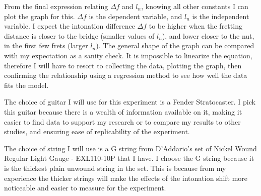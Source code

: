 From the final expression relating $\Delta f$ and $l_n$, knowing all other constants I can plot the graph for this. $\Delta f$ is the dependent variable, and $l_n$ is the independent variable. I expect the intonation difference $\Delta f$ to be higher when the fretting distance is closer to the bridge (smaller values of $l_n$), and lower closer to the nut, in the first few frets (larger $l_n$). The general shape of the graph can be compared with my expectation as a sanity check. It is impossible to linearize the equation, therefore I will have to resort to collecting the data, plotting the graph, then confirming the relationship using a regression method to see how well the data fits the model.

The choice of guitar I will use for this experiment is a Fender Stratocaster. I pick this guitar because there is a wealth of information available on it, making it easier to find data to support my research or to compare my results to other studies, and ensuring ease of replicability of the experiment. 

The choice of string I will use is a G string from D'Addario's set of Nickel Wound Regular Light Gauge - EXL110-10P that I have. I choose the G string because it is the thickest plain unwound string in the set. This is because from my experience the thicker strings will make the effects of the intonation shift more noticeable and easier to measure for the experiment. 